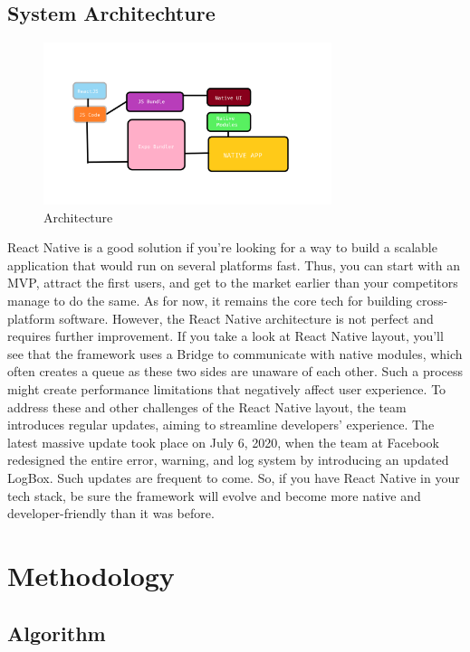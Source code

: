 \documentclass[12pt,a4paper]{report}
\begin{document}
\section{System Architechture}
\begin{figure}[h]
    \centering
    \includegraphics[width=0.75\textwidth]{arch}
\caption{Architecture}
    \label{fig:1}
\end{figure}
 React Native is a good solution if you’re looking for a way to build a scalable application that would run on several platforms fast. Thus, you can start with an MVP, attract the first users, and get to the market earlier than your competitors manage to do the same. As for now, it remains the core tech for building cross-platform software. However, the React Native architecture is not perfect and requires further improvement. If you take a look at React Native layout, you’ll see that the framework uses a Bridge to communicate with native modules, which often creates a queue as these two sides are unaware of each other. Such a process might create performance limitations that negatively affect user experience. To address these and other challenges of the React Native layout, the team introduces regular updates, aiming to streamline developers’ experience. The latest massive update took place on July 6, 2020, when the team at Facebook redesigned the entire error, warning, and log system by introducing an updated LogBox. Such updates are frequent to come. So, if you have React Native in your tech stack, be sure the framework will evolve and become more native and developer-friendly than it was before.

\newpage

\chapter{Methodology}
\section{Algorithm}
\end{document}

